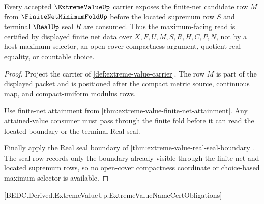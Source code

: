 \begin{theorem}
\label{thm:extreme-value-compact-net-maximum-row}
Every accepted $\ExtremeValueUp$ carrier exposes the finite-net candidate row $M$ from $\FiniteNetMinimumFoldUp$ before the located supremum row $S$ and terminal $\RealUp$ seal $R$ are consumed. Thus the maximum-facing read is certified by displayed finite net data over $X,F,U,M,S,R,H,C,P,N$, not by a host maximum selector, an open-cover compactness argument, quotient real equality, or countable choice.
\end{theorem}
\begin{proof}
Project the carrier of \autoref{def:extreme-value-carrier}. The row $M$ is part of the displayed packet and is positioned after the compact metric source, continuous map, and compact-uniform modulus rows.

Use finite-net attainment from \autoref{thm:extreme-value-finite-net-attainment}. Any attained-value consumer must pass through the finite fold before it can read the located boundary or the terminal Real seal.

Finally apply the Real seal boundary of \autoref{thm:extreme-value-real-seal-boundary}. The seal row records only the boundary already visible through the finite net and located supremum rows, so no open-cover compactness coordinate or choice-based maximum selector is available.
\end{proof}



[BEDC.Derived.ExtremeValueUp.ExtremeValueNameCertObligations]


